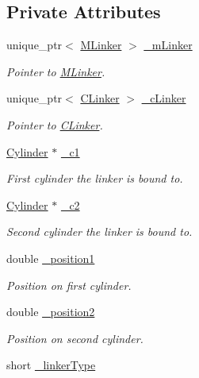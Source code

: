 \subsection*{Private Attributes}
\begin{DoxyCompactItemize}
\item 
unique\+\_\+ptr$<$ \hyperlink{classMLinker}{M\+Linker} $>$ \hyperlink{classLinker_a0b17c705cb1e5f89777f2675bd857e1c}{\+\_\+m\+Linker}
\begin{DoxyCompactList}\small\item\em Pointer to \hyperlink{classMLinker}{M\+Linker}. \end{DoxyCompactList}\item 
unique\+\_\+ptr$<$ \hyperlink{classCLinker}{C\+Linker} $>$ \hyperlink{classLinker_a6cbe666ab89dd1b4ed0eae03d8f25d63}{\+\_\+c\+Linker}
\begin{DoxyCompactList}\small\item\em Pointer to \hyperlink{classCLinker}{C\+Linker}. \end{DoxyCompactList}\item 
\hyperlink{classCylinder}{Cylinder} $\ast$ \hyperlink{classLinker_ae73f608f5ffd4098f7191de6ba504680}{\+\_\+c1}
\begin{DoxyCompactList}\small\item\em First cylinder the linker is bound to. \end{DoxyCompactList}\item 
\hyperlink{classCylinder}{Cylinder} $\ast$ \hyperlink{classLinker_a60b5cefe855173c410cb4471cd85d14f}{\+\_\+c2}
\begin{DoxyCompactList}\small\item\em Second cylinder the linker is bound to. \end{DoxyCompactList}\item 
double \hyperlink{classLinker_ad16ab7afce0a3a09b455f3407a382bf2}{\+\_\+position1}
\begin{DoxyCompactList}\small\item\em Position on first cylinder. \end{DoxyCompactList}\item 
double \hyperlink{classLinker_a1efe8ae37a4b70b843c0d7f2dfa47b90}{\+\_\+position2}
\begin{DoxyCompactList}\small\item\em Position on second cylinder. \end{DoxyCompactList}\item 
short \hyperlink{classLinker_a82213082aecfbbb0e69be04ae9357b68}{\+\_\+linker\+Type}

\end{DoxyCompactItemize}
